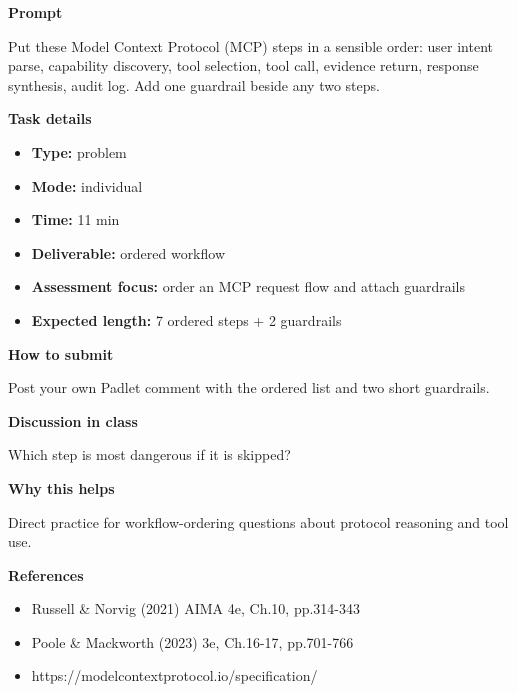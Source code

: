 \documentclass[11pt]{article}
\begin{document}
\begin{tcolorbox}[colback=white,colframe=MidnightBlue,title={Q2 Structured Problem},fonttitle=\bfseries,breakable]
\begin{center}
\end{center}

{\large\bfseries\color{MidnightBlue} Prompt}\par\medskip
Put these Model Context Protocol (MCP) steps in a sensible order: user intent parse, capability discovery, tool selection, tool call, evidence return, response synthesis, audit log. Add one guardrail beside any two steps.

{\large\bfseries\color{MidnightBlue} Task details}\par\medskip
\begin{itemize}\item \textbf{Type:} problem
\item \textbf{Mode:} individual
\item \textbf{Time:} 11 min
\item \textbf{Deliverable:} ordered workflow
\item \textbf{Assessment focus:} order an MCP request flow and attach guardrails
\item \textbf{Expected length:} 7 ordered steps + 2 guardrails\end{itemize}

{\large\bfseries\color{MidnightBlue} How to submit}\par\medskip
Post your own Padlet comment with the ordered list and two short guardrails.

{\large\bfseries\color{MidnightBlue} Discussion in class}\par\medskip
Which step is most dangerous if it is skipped?

{\large\bfseries\color{MidnightBlue} Why this helps}\par\medskip
Direct practice for workflow-ordering questions about protocol reasoning and tool use.

{\large\bfseries\color{MidnightBlue} References}\par\medskip
\begin{itemize}\item Russell \& Norvig (2021) AIMA 4e, Ch.10, pp.314-343
\item Poole \& Mackworth (2023) 3e, Ch.16-17, pp.701-766
\item https://modelcontextprotocol.io/specification/\end{itemize}
\end{tcolorbox}
\end{document}
